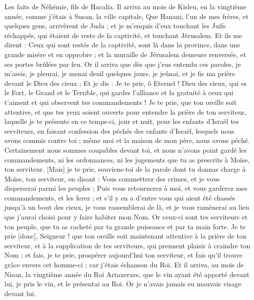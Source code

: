 \BFont
\begin{multicols}{2}
\VerseOne{}Les faits de Néhémie, fils de Hacalia. Il arriva au mois de Kisleu, en la vingtième année, comme j'étais à Susan, la ville capitale,
Que Hanani, l'un de mes frères, et quelques gens, arrivèrent de Juda ; et je m'enquis d'eux touchant les Juifs réchappés, qui étaient de reste de la captivité, et touchant Jérusalem.
Et ils me dirent : Ceux qui sont restés de la captivité, sont là dans la province, dans une grande misère et en opprobre ; et la muraille de Jérusalem demeure renversée, et ses portes brûlées par feu.
Or il arriva que dès que j'eus entendu ces paroles, je m'assis, je pleurai, je menai deuil quelques jours, je jeûnai, et je fis ma prière devant le Dieu des cieux ;
Et je dis : Je te prie, ô Eternel ! Dieu des cieux, qui es le Fort, le Grand et le Terrible, qui gardes l'alliance et la gratuité à ceux qui t'aiment et qui observent tes commandements !
Je te prie, que ton oreille soit attentive, et que tes yeux soient ouverts pour entendre la prière de ton serviteur, laquelle je te présente en ce temps-ci, jour et nuit, pour les enfants d'Israël tes serviteurs, en faisant confession des péchés des enfants d'Israël, lesquels nous avons commis contre toi ; même moi et la maison de mon père, nous avons péché.
Certainement nous sommes coupables devant toi, et nous n'avons point gardé les commandements, ni les ordonnances, ni les jugements que tu as prescrits à Moïse, ton serviteur.
[Mais] je te prie, souviens-toi de la parole dont tu donnas charge à Moïse, ton serviteur, en disant : Vous commettrez des crimes, et je vous disperserai parmi les peuples ;
Puis vous retournerez à moi, et vous garderez mes commandements, et les ferez ; et s'il y en a d'entre vous qui aient été chassés jusqu'à un bout des cieux, je vous rassemblerai de là, et je vous ramènerai au lieu que j'aurai choisi pour y faire habiter mon Nom.
Or ceux-ci sont tes serviteurs et ton peuple, que tu as racheté par ta grande puissance et par ta main forte.
Je te prie [donc], Seigneur ! que ton oreille soit maintenant attentive à la prière de ton serviteur, et à la supplication de tes serviteurs, qui prennent plaisir à craindre ton Nom ; et fais, je te prie, prospérer aujourd'hui ton serviteur, et fais qu'il trouve grâce envers cet homme-ci ; car j'étais échanson du Roi.
\VerseOne{}Et il arriva, au mois de Nisan, la vingtième année du Roi Artaxerxes, que le vin ayant été apporté devant lui, je pris le vin, et le présentai au Roi. Or je n'avais jamais eu mauvais visage devant lui.

\end{multicols}
